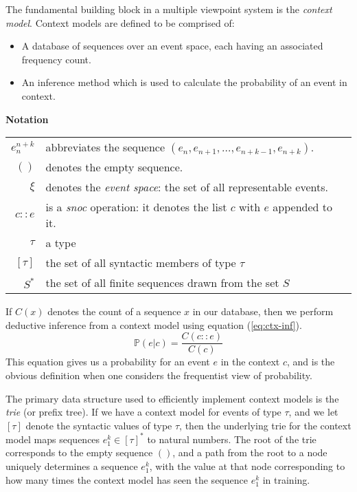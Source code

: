 \documentclass[12pt,a4paper,twoside]{article}
\begin{document}
The fundamental building block in a multiple viewpoint system is the
\emph{context model}. Context models are defined to be comprised of:
\begin{itemize}
  \item A database of sequences over an event space, each having an associated
    frequency count.
  \item An inference method which is used to calculate the probability of an
    event in context.
\end{itemize}
\vspace{2mm}
\textbf{Notation} ~~ \begin{tabular}{ r l }
  $e_{n}^{n + k}$ & abbreviates the sequence $(e_n, e_{n + 1}, \ldots, e_{n + k
  - 1}, e_{n + k})$. \\
  $()$ & denotes the empty sequence. \\
  $\xi$ & denotes the \emph{event space}: the set of all representable events.
  \\
  $c :: e$ & is a \emph{snoc} operation: it denotes the list $c$
  with $e$ appended to it. \\
  $\tau$ & a type \\
  $[\tau]$ & the set of all syntactic members of type $\tau$ \\
  $S^*$ & the set of all finite sequences drawn from the set $S$
\end{tabular}

If $C(x)$ denotes the count of a sequence $x$ in our database, then we perform
deductive inference from a context model using equation (\ref{eq:ctx-inf}).
\begin{equation}
  \mathbb{P}(e | c) = \frac{ C(c :: e) }{ C(c) } \label{eq:ctx-inf}
\end{equation}
This equation gives us a probability for an event $e$ in the context $c$, and is
the obvious definition when one considers the frequentist view of probability.

The primary data structure used to efficiently implement context models is the
\emph{trie} (or prefix tree). If we have a context model for events of type
$\tau$, and we let $[\tau]$ denote the syntactic values of type $\tau$, then the
underlying trie for the context model maps sequences $e_1^k \in [\tau]^*$ to
natural numbers. The root of the trie corresponds to the empty sequence $()$,
and a path from the root to a node uniquely determines a sequence $e_1^k$, with
the value at that node corresponding to how many times the context model has
seen the sequence $e_1^k$ in training.
\end{document}
